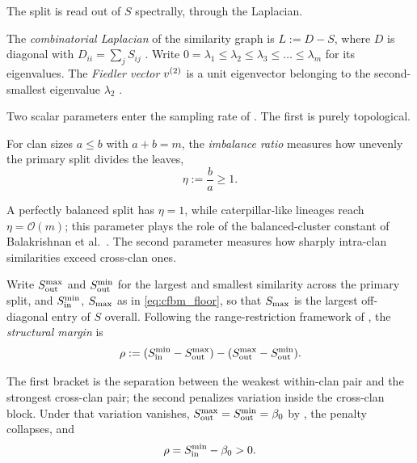 The split is read out of $S$ spectrally, through the Laplacian.

\begin{definition}\label{def:fiedler}
The \emph{combinatorial Laplacian} of the similarity graph is $L := D - S$, where
$D$ is diagonal with $D_{ii} = \sum_j S_{ij}$ \cite{aizenbud2023spectral}. Write
$0 = \lambda_1 \le \lambda_2 \le \lambda_3 \le \dots \le \lambda_m$ for its
eigenvalues. The \emph{Fiedler vector} $v^{(2)}$ is a unit eigenvector belonging to the
second-smallest eigenvalue $\lambda_2$ \cite{fiedler1975property,
vonluxburg2007tutorial}.
\end{definition}

\noindent Two scalar parameters enter the sampling rate of . The
first is purely topological.

\begin{definition}\label{def:imbalance}
For clan sizes $a \le b$ with $a+b=m$, the \emph{imbalance ratio} measures how
unevenly the primary split divides the leaves,
\begin{equation}\label{eq:imbalance_ratio}
   \eta:=\frac{b}{a}\ge1 .
\end{equation}
\end{definition}

\noindent A perfectly balanced split has $\eta=1$, while caterpillar-like lineages
reach $\eta=\mathcal O(m)$; this parameter plays the role of the balanced-cluster
constant of Balakrishnan et al.\ \cite{Balakrishnan2011clustering}. The second
parameter measures how sharply intra-clan similarities exceed cross-clan ones.

\begin{definition}\label{def:margin}
Write $S_{\mathrm{out}}^{\max}$ and $S_{\mathrm{out}}^{\min}$ for the largest and smallest similarity
across the primary split, and $S_{\mathrm{in}}^{\min}$, $S_{\max}$ as in \eqref{eq:cfbm_floor},
so that $S_{\max}$ is the largest off-diagonal entry of $S$ overall. Following the
range-restriction framework of \cite{Balakrishnan2011clustering}, the
\emph{structural margin} is
\begin{equation}\label{eq:margin_definition}
   \rho := (S_{\mathrm{in}}^{\min}-S_{\mathrm{out}}^{\max})-(S_{\mathrm{out}}^{\max}-S_{\mathrm{out}}^{\min}).
\end{equation}
\end{definition}

\noindent The first bracket is the separation between the weakest within-clan pair
and the strongest cross-clan pair; the second penalizes variation inside the
cross-clan block. Under  that variation vanishes,
$S_{\mathrm{out}}^{\max}=S_{\mathrm{out}}^{\min}=\beta_0$ by , the penalty collapses, and
\begin{equation}\label{eq:margin_under_clock}
   \rho=S_{\mathrm{in}}^{\min}-\beta_0 > 0 .
\end{equation}

